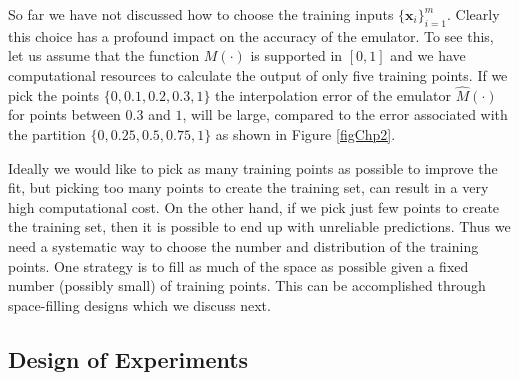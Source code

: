\documentclass[12pt]{book}
\newcommand{\x}{\textbf{x}}
\begin{document}
So far we have not discussed  how to choose the training inputs $\{\x_{i}\}_{i=1}^{m}$. 
Clearly this choice has a profound  impact on the accuracy of the emulator.
To see this, let us assume that the function $M(\cdot)$ is supported in $[0,1]$ and we  have
computational resources to calculate the output of only five training
points. If we pick the points $\{0,0.1,0.2,0.3,1\}$ the interpolation error of the emulator
$\widehat{M}(\cdot)$  for points between $0.3$ and $1$, 
will be large, compared to the error associated with the partition $\{0,0.25,0.5,0.75,1\}$ as
shown in Figure \ref{figChp2}.
 




Ideally we would like to pick as many training points as possible to improve the fit, 
but picking too many points
to create the training set, can result in a very high computational cost. On the other hand, if we pick 
just few points to create the training set, then it is possible to end up with unreliable predictions. 
Thus we need a systematic way to choose the number and distribution of  the training points. One strategy is to  
 fill as much of the space as possible given a fixed number (possibly small) of  training points. 
This can be accomplished
through    space-filling designs which we  discuss next. 
\newline

\subsection{Design of Experiments }\label{secDesignofExperiments}


\end{document}
